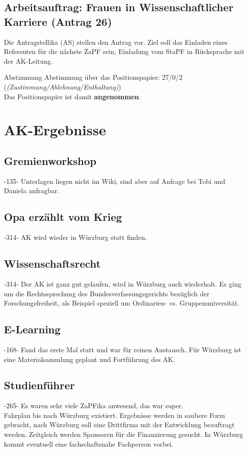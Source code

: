   \subsection{Arbeitsauftrag: Frauen in Wissenschaftlicher Karriere (Antrag 26)}
    Die Antragstellika (AS) stellen den Antrag vor.
    Ziel soll das Einladen eines Referenten für die nächste ZaPF sein, Einladung vom StaPF in Rücksprache mit der AK-Leitung.

    \begin{success}{Abstimmung}
      Abstimmung über das Positionspapier: 27/0/2 (\textit{(Zustimmung/Ablehnung/Enthaltung)}) \\
      Das Positionspapier ist damit \textbf{angenommen}.
    \end{success}

\section{AK-Ergebnisse}

  \subsection{Gremienworkshop}
    -135- Unterlagen liegen nicht im Wiki, sind aber auf Anfrage bei Tobi und Daniela anfragbar.

  \subsection{Opa erzählt vom Krieg}
    -314- AK wird wieder in Würzburg statt finden.

  \subsection{Wissenschaftsrecht}
    -314- Der AK ist ganz gut gelaufen, wird in Würzburg auch wiederholt.
    Es ging um die Rechtssprechung des Bundesverfassungsgerichts bezüglich der Forschungsfreiheit, als Beispiel speziell um Ordinarien- vs. Gruppenuniversität.

  \subsection{E-Learning}
    -168- Fand das erste Mal statt und war für reinen Austausch.
    Für Würzburg ist eine Materialsammlung geplant und Fortführung des AK.

  \subsection{Studienführer}
    -265- Es waren sehr viele ZaPFika anwesend, das war super. \\
    Fahrplan bis nach Würzburg existiert.
    Ergebnisse werden in saubere Form gebracht, nach Würzburg soll eine Drittfirma mit der Entwicklung beauftragt werden.
    Zeitgleich werden Sponsoren für die Finanzierung gesucht.
    In Würzburg kommt eventuell eine fachschaftsnahe Fachperson vorbei.

